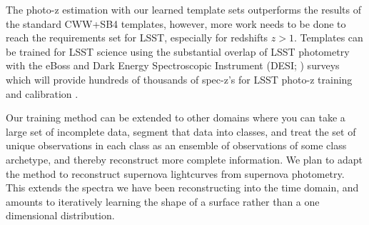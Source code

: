 The photo-z estimation with our learned template sets outperforms the results of the standard CWW+SB4 templates, however, more work needs to be done to reach the requirements set for LSST, especially for redshifts $z>1$.
Templates can be trained for LSST science using the substantial overlap of LSST photometry with the eBoss \citep{Dawson2016} and Dark Energy Spectroscopic Instrument (DESI; \citealt{DESICollaboration2016}) surveys which will provide hundreds of thousands of spec-z's for LSST photo-z training and calibration \citep{Schmidt2014,Newman2015}.

Our training method can be extended to other domains where you can take a large set of incomplete data, segment that data into classes, and treat the set of unique observations in each class as an ensemble of observations of some class archetype, and thereby reconstruct more complete information.
We plan to adapt the method to reconstruct supernova lightcurves from supernova photometry.
This extends the spectra we have been reconstructing into the time domain, and amounts to iteratively learning the shape of a surface rather than a one dimensional distribution.


